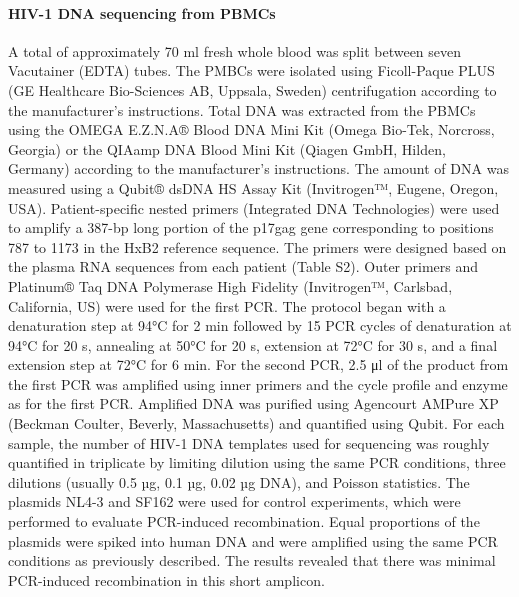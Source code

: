 \documentclass[aps,rmp,onecolumn,linenumbers]{revtex4-1}
\begin{document}
\paragraph*{HIV-1 DNA sequencing from PBMCs}
A total of approximately 70 ml fresh whole blood was split between seven Vacutainer (EDTA) tubes. The PMBCs were isolated using Ficoll-Paque PLUS (GE Healthcare Bio-Sciences AB, Uppsala, Sweden) centrifugation according to the manufacturer’s instructions. Total DNA was extracted from the PBMCs using the OMEGA E.Z.N.A® Blood DNA Mini Kit (Omega Bio-Tek, Norcross, Georgia) or the QIAamp DNA Blood Mini Kit (Qiagen GmbH, Hilden, Germany) according to the manufacturer’s instructions.
The amount of DNA was measured using a Qubit® dsDNA HS Assay Kit (Invitrogen™, Eugene, Oregon, USA). 
Patient-specific nested primers (Integrated DNA Technologies) were used to amplify a 387-bp long portion of the p17gag gene corresponding to positions 787 to 1173 in the HxB2 reference sequence. The primers were designed based on the plasma RNA sequences from each patient (Table S2). 
Outer primers and Platinum® Taq DNA Polymerase High Fidelity (Invitrogen™, Carlsbad, California, US) were used for the first PCR. The protocol began with a denaturation step at 94°C for 2 min followed by 15 PCR cycles of denaturation at 94°C for 20 s, annealing at 50°C for 20 s, extension at 72°C for 30 s, and a final extension step at 72°C for 6 min. For the second PCR, 2.5 μl of the product from the first PCR was amplified using inner primers and the cycle profile and enzyme as for the first PCR. Amplified DNA was purified using Agencourt AMPure XP (Beckman Coulter, Beverly, Massachusetts) and quantified using Qubit.
For each sample, the number of HIV-1 DNA templates used for sequencing was roughly quantified in triplicate by limiting dilution using the same PCR conditions, three dilutions (usually 0.5 µg, 0.1 µg, 0.02 µg DNA), and Poisson statistics.
The plasmids NL4-3 and SF162 were used for control experiments, which were performed to evaluate PCR-induced recombination. Equal proportions of the plasmids were spiked into human DNA and were amplified using the same PCR conditions as previously described. The results revealed that there was minimal PCR-induced recombination in this short amplicon. 
\end{document}
